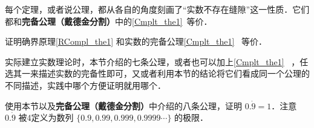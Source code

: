 每个定理，或者说公理，都从各自的角度刻画了“实数不存在缝隙”这一性质．它们都和\textbf{完备公理（戴德金分割）}中的\autoref{Cmplt_the1}~等价．

\begin{exercise}{}
证明确界原理\autoref{RCompl_the1} 和实数的完备公理\autoref{Cmplt_the1}~ 等价．
\end{exercise}

实际建立实数理论时，本节介绍的七条公理，或者也可以加上\autoref{Cmplt_the1}~ ，任选其一来描述实数的完备性即可，又或者利用本节的结论将它们看成同一个公理的不同描述，实践中哪个方便证明就用哪个．

\begin{exercise}{}
使用本节以及\textbf{完备公理（戴德金分割）}中介绍的八条公理，证明 $0.\dot{9}=1$．注意 $0.\dot{9}$ 被4定义为数列 $\{0.9, 0.99, 0.999, 0.9999\cdots\}$ 的极限．
\end{exercise}













